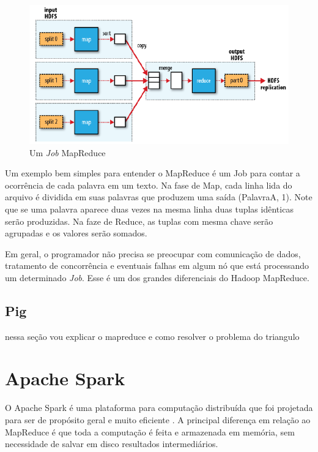 \begin{figure}
	\centering
	\includegraphics[width=\linewidth]{./mapreduce_job.png}
	\caption{Um \textit{Job} MapReduce}
	\label{fig:mapreduce}
\end{figure}

Um exemplo bem simples para entender o MapReduce é um Job para contar a ocorrência de cada palavra em um texto. Na fase de Map, cada linha lida do arquivo é dividida em suas palavras que produzem uma saída (PalavraA, 1). Note que se uma palavra aparece duas vezes na mesma linha duas tuplas idênticas serão produzidas. Na faze de Reduce, as tuplas com mesma chave serão agrupadas e os valores serão somados. 

Em geral, o programador não precisa se preocupar com comunicação de dados, tratamento de concorrência e eventuais falhas em algum nó que está processando um determinado \textit{Job}. Esse é um dos grandes diferenciais do Hadoop MapReduce. 

\subsection{Pig}
nessa seção vou explicar o mapreduce e como resolver o problema do triangulo

\section{Apache Spark}
O Apache Spark é uma plataforma para computação distribuída que foi projetada para ser de propósito geral e muito eficiente \cite{karau2015learning}. A principal diferença em relação ao MapReduce é que toda a computação é feita e armazenada em memória, sem necessidade de salvar em disco resultados intermediários. 

